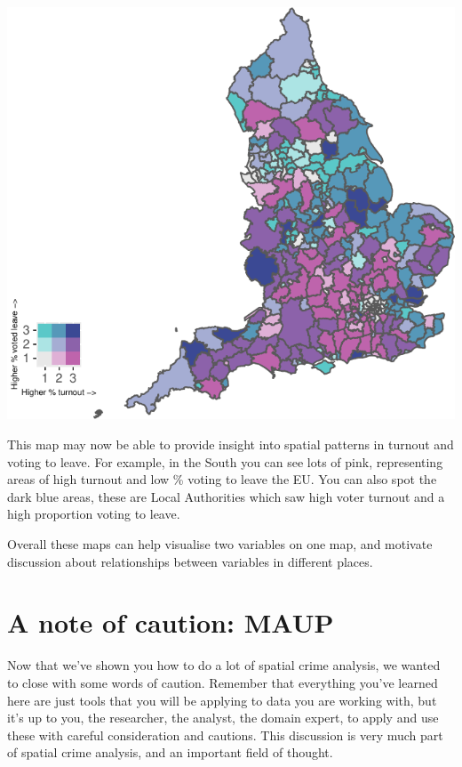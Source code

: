 \documentclass[
]{book}
\begin{document}
\includegraphics{crime_mapping_files/figure-latex/unnamed-chunk-151-1.pdf}

This map may now be able to provide insight into spatial patterns in turnout and voting to leave. For example, in the South you can see lots of pink, representing areas of high turnout and low \% voting to leave the EU. You can also spot the dark blue areas, these are Local Authorities which saw high voter turnout and a high proportion voting to leave.

Overall these maps can help visualise two variables on one map, and motivate discussion about relationships between variables in different places.

\hypertarget{a-note-of-caution-maup}{%
\section{A note of caution: MAUP}\label{a-note-of-caution-maup}}

Now that we've shown you how to do a lot of spatial crime analysis, we wanted to close with some words of caution. Remember that everything you've learned here are just tools that you will be applying to data you are working with, but it's up to you, the researcher, the analyst, the domain expert, to apply and use these with careful consideration and cautions. This discussion is very much part of spatial crime analysis, and an important field of thought.
\end{document}
